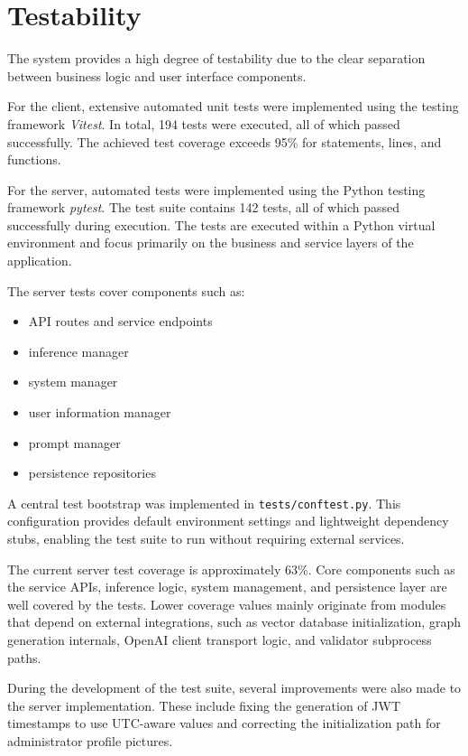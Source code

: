 \section{Testability}

The system provides a high degree of testability due to the clear
separation between business logic and user interface components.

For the client, extensive automated unit tests were implemented using
the testing framework \textit{Vitest}. In total, 194 tests were executed,
all of which passed successfully. The achieved test coverage exceeds
95\% for statements, lines, and functions.

For the server, automated tests were implemented using the Python
testing framework \textit{pytest}. The test suite contains 142 tests,
all of which passed successfully during execution. The tests are
executed within a Python virtual environment and focus primarily on
the business and service layers of the application.

The server tests cover components such as:

\begin{itemize}
    \item API routes and service endpoints
    \item inference manager
    \item system manager
    \item user information manager
    \item prompt manager
    \item persistence repositories
\end{itemize}

A central test bootstrap was implemented in
\texttt{tests/conftest.py}. This configuration provides default
environment settings and lightweight dependency stubs, enabling the
test suite to run without requiring external services.

The current server test coverage is approximately 63\%. Core components
such as the service APIs, inference logic, system management, and
persistence layer are well covered by the tests. Lower coverage values
mainly originate from modules that depend on external integrations,
such as vector database initialization, graph generation internals,
OpenAI client transport logic, and validator subprocess paths.

During the development of the test suite, several improvements were
also made to the server implementation. These include fixing the
generation of JWT timestamps to use UTC-aware values and correcting
the initialization path for administrator profile pictures.

